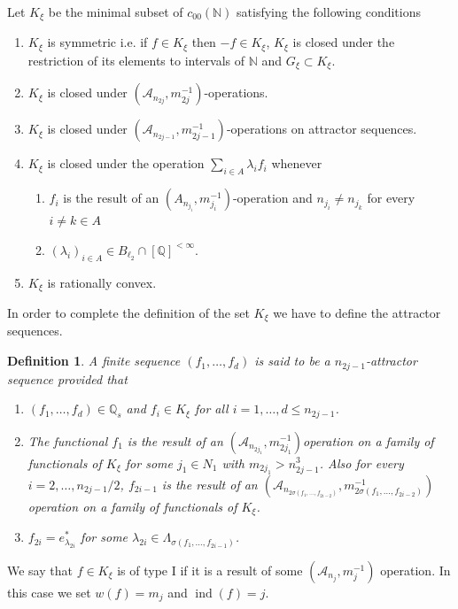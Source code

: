 \documentclass[a4paper]{amsart}
\theoremstyle{plain}
\newtheorem{definition}[theorem]{Definition}
\newcommand{\N}{\mathbb{N}}
\newcommand{\Q}{\mathbb{Q}}
\newcommand{\mc}{\mathcal}
\DeclareMathOperator{\ind}{ind}
\begin{document}
Let $K_{\xi}$ be the minimal subset of $c_{00}(\N)$ satisfying the following conditions
\begin{enumerate}
\item  $K_{\xi}$ is symmetric i.e. if $f\in K_{\xi}$ then $-f\in K_{\xi}$, $K_\xi$ is closed under the restriction of its elements to intervals of $\N$ and $G_{\xi}\subset K_{\xi}$.
\item $K_{\xi}$ is closed under $(\mc{A}_{n_{2j}},m_{2j}^{-1})$-operations.
\item $K_{\xi}$ is closed under $(\mc{A}_{n_{2j-1}},m_{2j-1}^{-1})$-operations on attractor sequences.
\item $K_{\xi}$ is closed under the  operation $\sum_{i\in A}\lambda_{i}f_{i}$ whenever
\begin{enumerate}
\item  $f_{i}$ is the  result of an $(A_{n_{j_i}},
m_{j_i}^{-1})$-operation and $n_{j_i}\ne n_{j_{k}}$ for every
$i\ne k\in A$ \item $(\lambda_{i})_{i\in A}\in B_{\ell_2}\cap
[\Q]^{<\infty}$.
\end{enumerate}
\item $K_{\xi}$ is rationally convex.
\end{enumerate}
In order to complete the definition of  the set $K_{\xi}$ we have to
define the attractor sequences.
\begin{definition}\label{d7.1}
A finite sequence $(f_{1},\dots,f_{d})$ is said to be a $n_{2j-1}$-attractor sequence
provided that
\begin{enumerate}
\item $(f_{1},\dots,f_{d})\in \Q_{s}$ and $f_{i}\in K_{\xi}$ for all
$i=1,\dots,d\leq n_{2j-1}$. \item  The functional  $f_{1}$ is the
result of an $(\mc{A}_{n_{2j_1}},m_{2j_1}^{-1})$operation on a
family of functionals of $K_{\xi}$ for some $j_{1}\in N_{1}$ with
$m_{2j_1}>n^3_{2j-1}$. Also for  every $i=2,\dots,n_{2j-1}/2$,
$f_{2i-1}$ is the result of an
$(\mc{A}_{n_{2\sigma(f_{1},\dots,f_{2i-2})}},m_{2\sigma(f_{1},\dots,f_{2i-2})}^{-1})$
operation on a family of functionals of $K_{\xi}$. \item
$f_{2i}=e^{*}_{\lambda_{2i}}$ for some
$\lambda_{2i}\in\Lambda_{\sigma(f_{1},\dots,f_{2i-1})}$.
\end{enumerate}
\end{definition}
We say that $f\in K_{\xi}$ is of type I if it is a result of some
$(\mc{A}_{n_j},m_{j}^{-1})$ operation. In this case we set $w(f)=m_{j}$ and $\ind(f)=j$.
\end{document}
